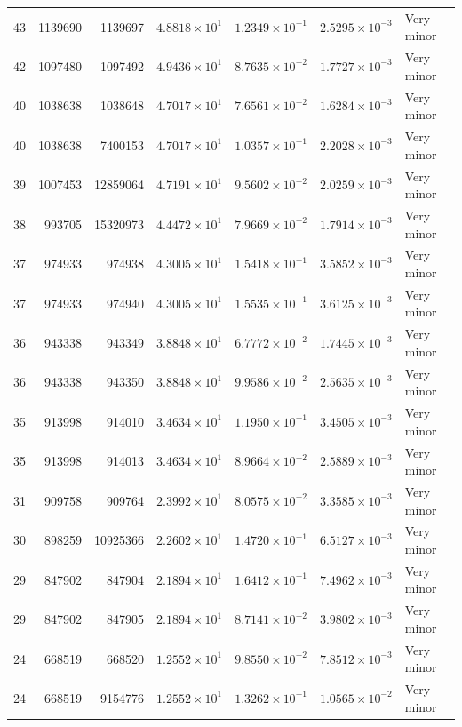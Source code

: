 \documentclass[twocolumn]{openjournal}
\begin{document}
\begin{landscape}
\begin{longtable}{rrrrrrl}
43 & 1139690 & 1139697 & $4.8818\times10^{1}$ & $1.2349\times10^{-1}$ & $2.5295\times10^{-3}$ & Very minor \\
42 & 1097480 & 1097492 & $4.9436\times10^{1}$ & $8.7635\times10^{-2}$ & $1.7727\times10^{-3}$ & Very minor \\
40 & 1038638 & 1038648 & $4.7017\times10^{1}$ & $7.6561\times10^{-2}$ & $1.6284\times10^{-3}$ & Very minor \\
40 & 1038638 & 7400153 & $4.7017\times10^{1}$ & $1.0357\times10^{-1}$ & $2.2028\times10^{-3}$ & Very minor \\
39 & 1007453 & 12859064 & $4.7191\times10^{1}$ & $9.5602\times10^{-2}$ & $2.0259\times10^{-3}$ & Very minor \\
38 & 993705 & 15320973 & $4.4472\times10^{1}$ & $7.9669\times10^{-2}$ & $1.7914\times10^{-3}$ & Very minor \\
37 & 974933 & 974938 & $4.3005\times10^{1}$ & $1.5418\times10^{-1}$ & $3.5852\times10^{-3}$ & Very minor \\
37 & 974933 & 974940 & $4.3005\times10^{1}$ & $1.5535\times10^{-1}$ & $3.6125\times10^{-3}$ & Very minor \\
36 & 943338 & 943349 & $3.8848\times10^{1}$ & $6.7772\times10^{-2}$ & $1.7445\times10^{-3}$ & Very minor \\
36 & 943338 & 943350 & $3.8848\times10^{1}$ & $9.9586\times10^{-2}$ & $2.5635\times10^{-3}$ & Very minor \\
35 & 913998 & 914010 & $3.4634\times10^{1}$ & $1.1950\times10^{-1}$ & $3.4505\times10^{-3}$ & Very minor \\
35 & 913998 & 914013 & $3.4634\times10^{1}$ & $8.9664\times10^{-2}$ & $2.5889\times10^{-3}$ & Very minor \\
31 & 909758 & 909764 & $2.3992\times10^{1}$ & $8.0575\times10^{-2}$ & $3.3585\times10^{-3}$ & Very minor \\
30 & 898259 & 10925366 & $2.2602\times10^{1}$ & $1.4720\times10^{-1}$ & $6.5127\times10^{-3}$ & Very minor \\
29 & 847902 & 847904 & $2.1894\times10^{1}$ & $1.6412\times10^{-1}$ & $7.4962\times10^{-3}$ & Very minor \\
29 & 847902 & 847905 & $2.1894\times10^{1}$ & $8.7141\times10^{-2}$ & $3.9802\times10^{-3}$ & Very minor \\
24 & 668519 & 668520 & $1.2552\times10^{1}$ & $9.8550\times10^{-2}$ & $7.8512\times10^{-3}$ & Very minor \\
24 & 668519 & 9154776 & $1.2552\times10^{1}$ & $1.3262\times10^{-1}$ & $1.0565\times10^{-2}$ & Very minor \\

\end{longtable}
\end{landscape}
\end{document}
